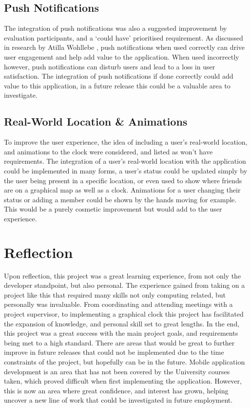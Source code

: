 \subsection*{Push Notifications}
The integration of push notifications was also a suggested improvement by evaluation participants, and a `could have' prioritised requirement. As discussed in research by Atilla Wohllebe \cite{pushNoti}, push notifications when used correctly can drive user engagement and help add value to the application. When used incorrectly however, push notifications can disturb users and lead to a loss in user satisfaction. The integration of push notifications if done correctly could add value to this application, in a future release this could be a valuable area to investigate.

\subsection*{Real-World Location \& Animations}
To improve the user experience, the idea of including a user's real-world location, and animations to the clock were considered, and listed as won't have requirements. The integration of a user's real-world location with the application could be implemented in many forms, a user's status could be updated simply by the user being present in a specific location, or even used to show where friends are on a graphical map as well as a clock. Animations for a user changing their status or adding a member could be shown by the hands moving for example. This would be a purely cosmetic improvement but would add to the user experience.

\section{Reflection}

Upon reflection, this project was a great learning experience, from not only the developer standpoint, but also personal. The experience gained from taking on a project like this that required many skills not only computing related, but personally was invaluable. From coordinating and attending meetings with a project supervisor, to implementing a graphical clock this project has facilitated the expansion of knowledge, and personal skill set to great lengths. In the end, this project was a great success with the main project goals, and requirements being met to a high standard. There are areas that would be great to further improve in future releases that could not be implemented due to the time constraints of the project, but hopefully can be in the future. Mobile application development is an area that has not been covered by the University courses taken, which proved difficult when first implementing the application. However, this is now an area where great confidence, and interest has grown, helping uncover a new line of work that could be investigated in future employment.  